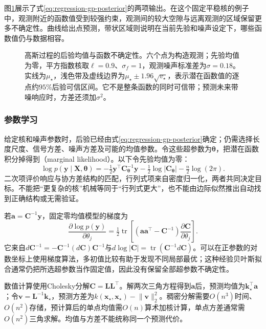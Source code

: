 图\ref{fig:regression-gp-posterior}展示了式\eqref{eq:regression-gp-posterior}的两项输出。在这个固定平稳核的例子中，观测附近的函数值受到较强约束，观测间的较大空隙与远离观测的区域保留更多不确定性。曲线给出点预测，带状区域则说明在当前先验和噪声设定下，哪些函数值仍与数据相容。

\begin{figure}[htbp]
  \centering
  
  \caption{高斯过程的后验均值与函数不确定性。六个点为构造观测；先验均值为零，平方指数核取$\ell=0.9$、$\sigma_f=1$，观测噪声标准差为$\sigma=0.18$。实线为$\mu_{\star}$，浅色带及虚线边界为$\mu_{\star}\pm1.96\sqrt{v_{\star}}$，表示潜在函数值的逐点约$95\%$后验可信区间。它不是整条函数的同时可信带；预测未来带噪响应时，方差还须加$\sigma^2$。}
  \label{fig:regression-gp-posterior}
\end{figure}

\subsubsection{参数学习}
\label{sec:regression-gpr-learning}

给定核和噪声参数时，后验已经由式\eqref{eq:regression-gp-posterior}确定；仍需选择长度尺度、信号方差、噪声方差及可能的均值参数。令这些超参数为$\bm{\theta}$，把潜在函数积分掉得到（marginal likelihood）。以下令先验均值为零：
\begin{equation}
  \log p(\bm{y}\mid\bm{X},\bm{\theta})
   =-\tfrac12\bm{y}^{\top}\bm{C}_{\bm{\theta}}^{-1}\bm{y}
    -\tfrac12\log|\bm{C}_{\bm{\theta}}|
    -\tfrac n2\log(2\pi).
  \label{eq:regression-gp-evidence}
\end{equation}
二次项评价响应与协方差结构的匹配，行列式项来自密度归一化，两者共同决定目标。不能把“更复杂的核”机械等同于“行列式更大”，也不能由边际似然推出自动找到正确结构或无需验证。

若$\bm{a}=\bm{C}^{-1}\bm{y}$，固定零均值模型的梯度为
\[
  \frac{\partial\log p(\bm{y})}{\partial\theta_j}
  =\tfrac12\operatorname{tr}\!\left[
    (\bm{a}\bm{a}^{\top}-\bm{C}^{-1})
    \frac{\partial\bm{C}}{\partial\theta_j}\right].
\]
它来自$d\bm{C}^{-1}=-\bm{C}^{-1}(d\bm{C})\bm{C}^{-1}$与$d\log|\bm{C}|=\operatorname{tr}(\bm{C}^{-1}d\bm{C})$。可以在正参数的对数坐标上使用梯度算法，多初值比较有助于发现不同局部最优；这种经验贝叶斯拟合通常仍把所选超参数当作固定值，因此没有保留全部超参数不确定性。

数值计算使用Cholesky分解$\bm{C}=\bm{L}\bm{L}^{\top}$。解两次三角方程得到$\bm{a}$后，预测均值为$\bm{k}_{\star}^{\top}\bm{a}$；令$\bm{v}=\bm{L}^{-1}\bm{k}_{\star}$，预测方差为$k(\bm{x}_{\star},\bm{x}_{\star})-\lVert\bm{v}\rVert_2^2$。稠密分解需要$O(n^3)$时间、$O(n^2)$存储，预计算后的单点均值需$O(n)$算术加核计算，单点方差通常需$O(n^2)$三角求解。均值与方差不能统称同一个预测代价。

